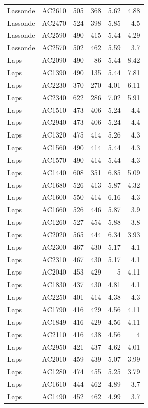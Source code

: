 \documentclass[article,10pt,microtype]{article}
\begin{document}
\begin{longtable}{llrrrr}
Lassonde & AC2610 & 505 & 368 & 5.62 & 4.88\\
Lassonde & AC2470 & 524 & 398 & 5.85 & 4.5\\
Lassonde & AC2590 & 490 & 415 & 5.44 & 4.29\\
Lassonde & AC2570 & 502 & 462 & 5.59 & 3.7\\
Laps & AC2090 & 490 & 86 & 5.44 & 8.42\\
Laps & AC1390 & 490 & 135 & 5.44 & 7.81\\
Laps & AC2230 & 370 & 270 & 4.01 & 6.11\\
Laps & AC2340 & 622 & 286 & 7.02 & 5.91\\
Laps & AC1510 & 473 & 406 & 5.24 & 4.4\\
Laps & AC2940 & 473 & 406 & 5.24 & 4.4\\
Laps & AC1320 & 475 & 414 & 5.26 & 4.3\\
Laps & AC1560 & 490 & 414 & 5.44 & 4.3\\
Laps & AC1570 & 490 & 414 & 5.44 & 4.3\\
Laps & AC1440 & 608 & 351 & 6.85 & 5.09\\
Laps & AC1680 & 526 & 413 & 5.87 & 4.32\\
Laps & AC1600 & 550 & 414 & 6.16 & 4.3\\
Laps & AC1660 & 526 & 446 & 5.87 & 3.9\\
Laps & AC1260 & 527 & 454 & 5.88 & 3.8\\
Laps & AC2020 & 565 & 444 & 6.34 & 3.93\\
Laps & AC2300 & 467 & 430 & 5.17 & 4.1\\
Laps & AC2310 & 467 & 430 & 5.17 & 4.1\\
Laps & AC2040 & 453 & 429 & 5 & 4.11\\
Laps & AC1830 & 437 & 430 & 4.81 & 4.1\\
Laps & AC2250 & 401 & 414 & 4.38 & 4.3\\
Laps & AC1790 & 416 & 429 & 4.56 & 4.11\\
Laps & AC1849 & 416 & 429 & 4.56 & 4.11\\
Laps & AC2110 & 416 & 438 & 4.56 & 4\\
Laps & AC2950 & 421 & 437 & 4.62 & 4.01\\
Laps & AC2010 & 459 & 439 & 5.07 & 3.99\\
Laps & AC1280 & 474 & 455 & 5.25 & 3.79\\
Laps & AC1610 & 444 & 462 & 4.89 & 3.7\\
Laps & AC1490 & 452 & 462 & 4.99 & 3.7\\

\end{longtable}
\end{document}
